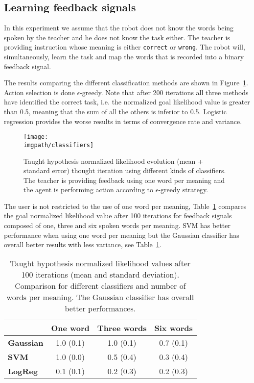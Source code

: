 \subsection{Learning feedback signals}

In this experiment we assume that the robot does not know the words being spoken by the teacher and he does not know the task either. The teacher is providing instruction whose meaning is either \texttt{correct} or \texttt{wrong}. The robot will, simultaneously, learn the task and map the words that is recorded into a binary feedback signal.

The results comparing the different classification methods are shown in Figure~\ref{fig:FeedbackOneWord}. Action selection is done $\epsilon$-greedy. Note that after 200 iterations all three methods have identified the correct task, i.e. the normalized goal likelihood value is greater than 0.5, meaning that the sum of all the others is inferior to 0.5. Logistic regression provides the worse results in terms of convergence rate and variance.

\begin{figure}[!htbp]
  \centering
  \texttt{[image: \\imgpath/classifiers]}
  \caption{Taught hypothesis normalized likelihood evolution (mean + standard error) thought iteration using different kinds of classifiers. The teacher is providing feedback using one word per meaning and the agent is performing action according to $\epsilon$-greedy strategy.}
  \label{fig:FeedbackOneWord}
\end{figure}

The user is not restricted to the use of one word per meaning, Table~\ref{tab:1} compares the goal normalized likelihood value after 100 iterations for feedback signals composed of one, three and six spoken words per meaning. SVM has better performance when using one word per meaning but the Gaussian classifier has overall better results with less variance, see Table~\ref{tab:1}. 

\begin{table}[htbp]
\centering
\begin{tabular}{|l|c|c|c|}
\hline
&\textbf{One word}&\textbf{Three words}&\textbf{Six words}\\\hline
\textbf{Gaussian}&1.0 (0.1)&1.0 (0.1)&0.7 (0.1)\\\hline
\textbf{SVM}&1.0 (0.0)&0.5 (0.4)&0.3 (0.4)\\\hline
\textbf{LogReg}&0.1 (0.1)&0.2 (0.3)&0.2 (0.3)\\\hline
\end{tabular}
\caption{Taught hypothesis normalized likelihood values after 100 iterations (mean and standard deviation). Comparison for different classifiers and number of words per meaning. The Gaussian classifier has overall better performances.}
\label{tab:1}
\end{table}

